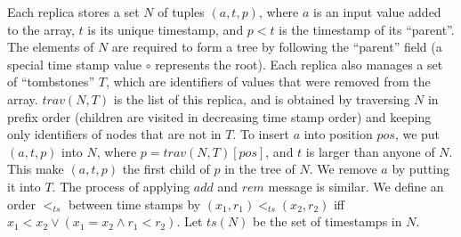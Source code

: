  Each replica stores a set $N$ of tuples $(a,t,p)$, where $a$ is an input value added to the array, $t$ is its unique timestamp, and $p < t$ is the timestamp of its ``parent''. The elements of $N$ are required to form a tree by following the ``parent'' field (a special time stamp value $\circ$ represents the root).
Each replica also manages a set of ``tombstones'' $T$, which are identifiers of values that were removed from the array. {\color {red} $\mathit{trav}(N,T)$ is the list of this replica, and is obtained by traversing $N$ in prefix order (children are visited in decreasing time stamp order) and keeping only identifiers of nodes that are not in $T$. To insert $a$ into position $\mathit{pos}$, we put $(a,t,p)$ into $N$, where $p = \mathit{trav}(N,T)[\mathit{pos}]$, and $t$ is larger than anyone of $N$. This make $(a,t,p)$ the first child of $p$ in the tree of $N$. We remove $a$ by putting it into $T$. The process of applying $\mathit{add}$ and $\mathit{rem}$ message is similar. We define an order $<_{\mathit{ts}}$ between time stamps by $(x_1,r_1) <_{\mathit{ts}} (x_2,r_2)$ iff $x_1 < x_2 \vee (x_1 = x_2 \wedge r_1 < r_2)$. Let $\mathit{ts}(N)$ be the set of timestamps in $N$.
}








